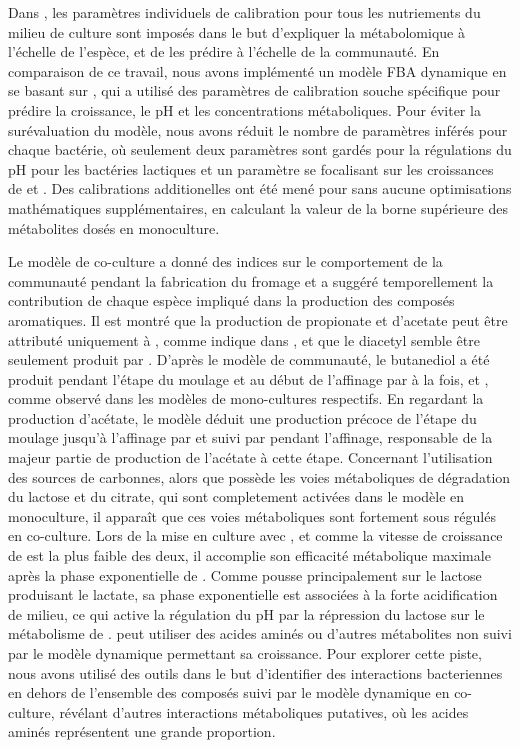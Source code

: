 \documentclass[../main.tex]{subfiles}
\begin{document}
Dans \citep{Ozcan.2020}, les paramètres individuels de calibration pour tous les nutriements du milieu de culture sont imposés dans le but d'expliquer la métabolomique à l'échelle de l'espèce, et de les prédire à l'échelle de la communauté. En comparaison de ce travail, nous avons implémenté un modèle FBA dynamique en se basant sur \citep{Mahadevan.2002}, qui a utilisé des paramètres de calibration souche spécifique pour prédire la croissance, le pH et les concentrations métaboliques. Pour éviter la surévaluation du modèle, nous avons réduit le nombre de paramètres inférés pour chaque bactérie, où seulement deux paramètres sont gardés pour la régulations du pH pour les bactéries lactiques et un paramètre se focalisant sur les croissances de \plantarum et \freud. Des calibrations additionelles ont été mené pour \freud sans aucune optimisations mathématiques supplémentaires, en calculant la valeur de la borne supérieure des métabolites dosés en monoculture. 

Le modèle de co-culture a donné des indices sur le comportement de la communauté pendant la fabrication du fromage et a suggéré temporellement la contribution de chaque espèce impliqué dans la production des composés aromatiques. Il est montré que la production de propionate et d'acetate peut être attributé uniquement à \freud, comme indique dans \citep{Cao2021}, et que le diacetyl semble être seulement produit par \lactis. D'après le modèle de communauté, le butanediol a été produit pendant l'étape du moulage et au début de l'affinage par à la fois, \lactis et \plantarum, comme observé dans les modèles de mono-cultures respectifs. En regardant la production d'acétate, le modèle déduit une production précoce de l'étape du moulage jusqu'à l'affinage par \lactis et \plantarum suivi par \freud pendant l'affinage, responsable de la majeur partie de production de l'acétate à cette étape. Concernant l'utilisation des sources de carbonnes, alors que \plantarum possède les voies métaboliques de dégradation du lactose et du citrate, qui sont completement activées dans le modèle en monoculture, il apparaît que ces voies métaboliques sont fortement sous régulés en co-culture. Lors de la mise en culture avec \lactis, et comme la vitesse de croissance de \plantarum est la plus faible des deux, il accomplie son efficacité métabolique maximale après la phase exponentielle de \lactis. Comme \lactis pousse principalement sur le lactose produisant le lactate, sa phase exponentielle est associées à la forte acidification de milieu, ce qui active la régulation du pH par la répression du lactose sur le métabolisme de \plantarum. \plantarum peut utiliser des acides aminés ou d'autres métabolites non suivi par le modèle dynamique permettant sa croissance. Pour explorer cette piste, nous avons utilisé des outils dans le but d'identifier des interactions bacteriennes en dehors de l'ensemble des composés suivi par le modèle dynamique en co-culture, révélant d'autres interactions métaboliques putatives, où les acides aminés représentent une grande proportion.
\end{document}
